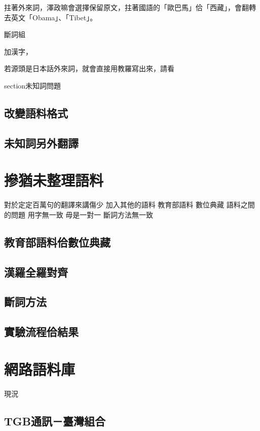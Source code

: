 \documentclass[final,oneside,onecolumn,12pt,a4paper]{book}%
\begin{document}
拄著外來詞，澤政嘛會選擇保留原文，拄著國語的「歐巴馬」佮「西藏」，會翻轉去英文「Obama」、「Tibet」。

斷詞組

加漢字，

若源頭是日本話外來詞，就會直接用教羅寫出來，請看

section{未知詞問題}
\label{節：未知詞問題}

\section{改變語料格式}
\label{節：改變語料格式}

\section{未知詞另外翻譯}
\label{節：未知詞另外翻譯}

\chapter{摻猶未整理語料}
\label{章：摻猶未整理語料}
對於定定百萬句的翻譯來講傷少
加入其他的語料
教育部語料
數位典藏
 語料之間的問題
用字無一致
毋是一對一
斷詞方法無一致

\section{教育部語料佮數位典藏}
\label{節：教育部語料佮數位典藏}

\section{漢羅全羅對齊}
\label{節：漢羅全羅對齊}

\section{斷詞方法}
\label{節：斷詞方法}

\section{實驗流程佮結果}
\label{節：實驗流程佮結果}


\chapter{網路語料庫}
\label{章：網路語料庫}
現況
\section{TGB通訊－臺灣組合}
\label{節：TGB通訊－臺灣組合}
\end{document}
